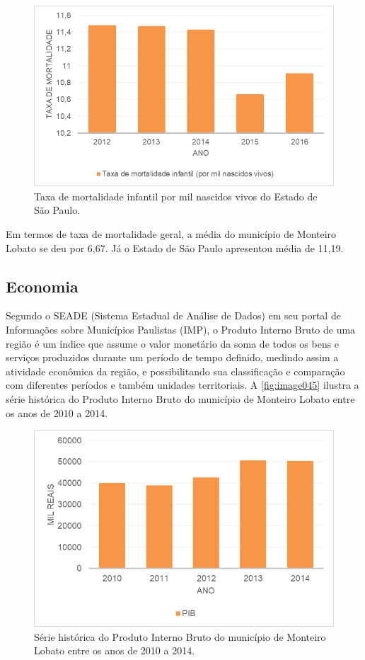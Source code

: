  \begin{figure}[h!]
	\centering
	\includegraphics[width=0.75\linewidth]{produtos/proddois/image044}
	\caption{Taxa de mortalidade infantil por mil nascidos vivos do Estado de São Paulo.}
	\label{fig:image044}
\end{figure}

Em termos de taxa de mortalidade geral, a média do município de Monteiro Lobato se deu por 6,67. Já o Estado de São Paulo apresentou média de 11,19.
\clearpage

\subsection{Economia}

Segundo o SEADE (Sistema Estadual de Análise de Dados) em seu portal de Informações sobre Municípios Paulistas (IMP), o Produto Interno Bruto de uma região é um índice que assume o valor monetário da soma de todos os bens e serviços produzidos durante um período de tempo definido, medindo assim a atividade econômica da região, e possibilitando sua classificação e comparação com diferentes períodos e também unidades territoriais. A \autoref{fig:image045} ilustra a série histórica do Produto Interno Bruto do município de Monteiro Lobato entre os anos de 2010 a 2014.

 \begin{figure}[h!]
	\centering
	\includegraphics[width=0.8\linewidth]{produtos/proddois/image045}
	\caption{Série histórica do Produto Interno Bruto do município de Monteiro Lobato entre os anos de 2010 a 2014.}
	\label{fig:image045}
\end{figure}

